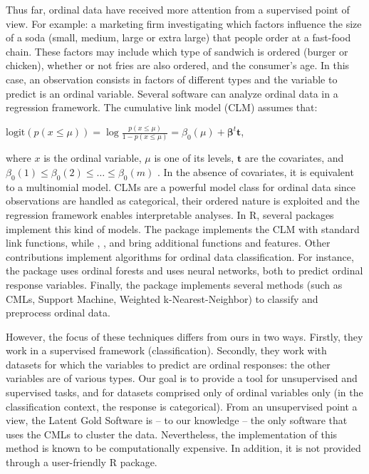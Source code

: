 Thus far, ordinal data have received more attention from a supervised point of view. For example: a marketing firm investigating which factors influence the size of a soda (small, medium, large or extra large) that people order at a fast-food chain. These factors may include which type of sandwich is ordered (burger or chicken), whether or not fries are also ordered, and the consumer's age. In this case, an observation consists in factors of different types and the variable to predict is an ordinal variable. Several software can analyze ordinal data in a regression framework. The cumulative link model (CLM) assumes that:

\begin{center}
$\mbox{logit}\left(p\left(x\leq \mu\right)\right)=\log\frac{p\left(x\leq \mu\right)}{1-p\left(x\leq \mu\right)} = \beta_{0}\left(\mu\right) + \boldsymbol{\beta}^t\boldsymbol{t}$,
\end{center}

\noindent where $x$ is the ordinal variable, $\mu$ is one of its levels, $\boldsymbol{t}$ are the covariates, and $\beta_0 \left(1\right) \leq \beta_0 \left(2\right) \leq \ldots \leq \beta_0 \left(m\right)$ . In the absence of covariates, it is equivalent to a multinomial model. 
CLMs are a powerful model class for ordinal data since observations are handled as categorical, their ordered nature is exploited and the regression framework enables interpretable analyses. In R, several packages implement this kind of models. The package  \citep{venables2002} implements the CLM with standard link functions, while  \citep{Yee2010},  \citep{harrell2018},  \citep{burkner17} and  \citep{Christensen15} bring additional functions and features. Other contributions implement algorithms for ordinal data classification. For instance, the  package \citep{Hornung19,Hornung19b} uses ordinal forests and  \citep{cannon17} uses neural networks, both to predict ordinal response variables. Finally, the  package \citep{Gomez2019} implements several methods (such as CMLs, Support Machine, Weighted k-Nearest-Neighbor) to classify and preprocess ordinal data.

However, the focus of these techniques differs from ours in two ways. Firstly, they work in a supervised framework (classification). Secondly, they work with datasets for which the variables to predict are ordinal responses: the other variables are of various types. Our goal is to provide a tool for unsupervised and supervised tasks, and for datasets comprised only of ordinal variables only (in the classification context, the response is categorical). From an unsupervised point a view, the Latent Gold Software \cite{Vermunt06} is -- to our knowledge -- the only software that uses the CMLs to cluster the data. Nevertheless, the implementation of this method is known to be computationally expensive. In addition, it is not provided through a user-friendly R package.  

